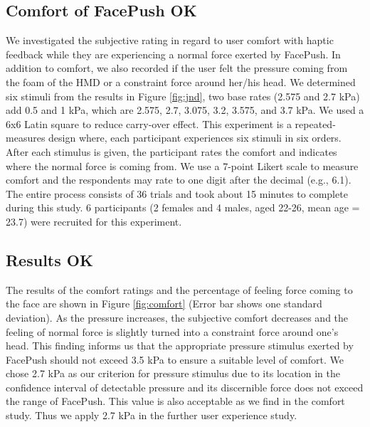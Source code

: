 \subsection{Comfort of FacePush OK}
We investigated the subjective rating in regard to user comfort with haptic feedback while they are experiencing a normal force exerted by FacePush. In addition to comfort, we also recorded if the user felt the pressure coming from the foam of the HMD or a constraint force around her/his head. We determined six stimuli from the results in Figure \ref{fig:jnd}, two base rates (2.575 and 2.7 kPa) add 0.5 and 1 kPa, which are 2.575, 2.7, 3.075, 3.2, 3.575, and 3.7 kPa. We used a 6x6 Latin square to reduce carry-over effect. This experiment is a repeated-measures design where, each participant experiences six stimuli in six orders. 
After each stimulus is given, the participant rates the comfort and indicates where the normal force is coming from. We use a 7-point Likert scale to measure comfort and the respondents may rate to one digit after the decimal (e.g., 6.1). The entire process consists of 36 trials and took about 15 minutes to complete during this study. 6 participants (2 females and 4 males, aged 22-26, mean age = 23.7) were recruited for this experiment. 

\subsection{Results OK}
The results of the comfort ratings and the percentage of feeling force coming to the face are shown in Figure \ref{fig:comfort} (Error bar shows one standard deviation). As the pressure increases, the subjective comfort decreases and the feeling of normal force is slightly turned into a constraint force around one's head. This finding informs us that the appropriate pressure stimulus exerted by FacePush should not exceed 3.5 kPa to ensure a suitable level of comfort. We chose 2.7 kPa as our criterion for pressure stimulus due to its location in the confidence interval of detectable pressure and its discernible force does not exceed the range of FacePush. This value is also acceptable as we find in the comfort study. Thus we apply 2.7 kPa in the further user experience study.

